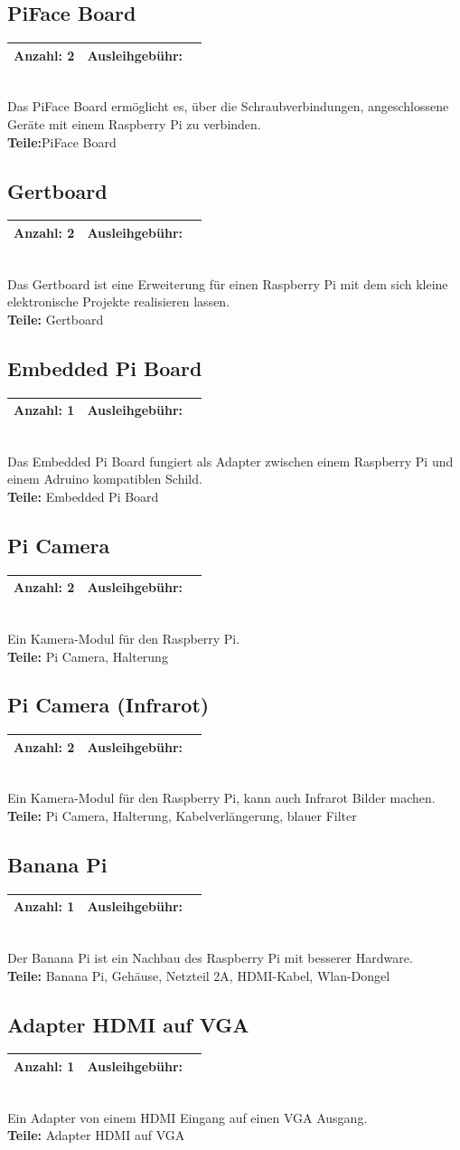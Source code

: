 \documentclass[a4paper]{article}
\newcommand{\infobox}[3] %
        {\par
                \begin{tabular}{| c | c | c| }
                \hline
                Anzahl: #1 & Ausleihgebühr: \EUR{#2}   \\
                \hline
                \end{tabular} \\
        }
\begin{document}
\subsection{PiFace Board}
\infobox{2}{2,5}{Neu}
Das PiFace Board ermöglicht es, über die Schraubverbindungen, angeschlossene Geräte mit einem Raspberry Pi zu verbinden.\\
\textbf{Teile:}PiFace Board

\subsection{Gertboard}
\infobox{2}{2,5}{Neu}
Das Gertboard ist eine Erweiterung für einen Raspberry Pi mit dem sich kleine elektronische Projekte realisieren lassen.\\
\textbf{Teile:} Gertboard

\subsection{Embedded Pi Board}
\infobox{1}{2,5}{Neu}
Das Embedded Pi Board fungiert als Adapter zwischen einem Raspberry Pi und einem Adruino kompatiblen Schild. \\
\textbf{Teile:} Embedded Pi Board

\subsection{Pi Camera}
\infobox{2}{0}{Neu}
Ein Kamera-Modul für den Raspberry Pi.\\
\textbf{Teile:} Pi Camera, Halterung

\subsection{Pi Camera (Infrarot)}
\infobox{2}{0}{Neu}
Ein Kamera-Modul für den Raspberry Pi, kann auch Infrarot Bilder machen. \\
\textbf{Teile:} Pi Camera, Halterung, Kabelverlängerung, blauer Filter

\subsection{Banana Pi}
\infobox{1}{0}{Neu}
Der Banana Pi ist ein Nachbau des Raspberry Pi mit besserer Hardware. \\
\textbf{Teile:} Banana Pi, Gehäuse, Netzteil 2A, HDMI-Kabel, Wlan-Dongel

\subsection{Adapter HDMI auf VGA}
\infobox{1}{0}{Neu}
Ein Adapter von einem HDMI Eingang auf einen VGA Ausgang. \\
\textbf{Teile:} Adapter HDMI auf VGA
\end{document}
